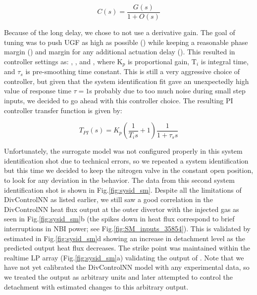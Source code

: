 \begin{equation}
 C(s) = \frac{G(s)}{1 + O(s)}
\label{eq:cltf}
\end{equation}



Because of the long delay, we chose to not use a derivative gain.
The goal of tuning was to push \ac{UGF} as high as possible (\AfracUGF) while keeping a reasonable phase margin (\AfracPhaseMargin) and margin for any additional actuation delay (\AfracDelayMargin).
This resulted in controller settings as: \AfracKp, \AfracTi, and \Afracstau, where K$_p$ is proportional gain, T$_i$ is integral time, and $\tau_s$ is pre-smoothing time constant.
This is still a very aggressive choice of controller, but given that the system identification fit gave an unexpectedly high value of response time $\tau=1$s probably due to too much noise during small step inputs, we decided to go ahead with this controller choice.
The resulting PI controller transfer function is given by:

\begin{equation}
 T_{PI}(s) = K_p \left( \frac{1}{T_i s} + 1\right) \frac{1}{1 + \tau_s s}
\label{eq:PI}
\end{equation}

Unfortunately, the surrogate model was not configured properly in this system identification shot due to technical errors, so we repeated a system identification but this time we decided to keep the nitrogen valve in the constant open position, to look for any deviation in the behavior.
The data from this second system identification shot is shown in Fig.\ref{fig:sysid_sm}.
Despite all the limitations of DivControlNN as listed earlier, we still saw a good correlation in the DivControlNN heat flux output at the outer divertor with the injected gas as seen in Fig.\ref{fig:sysid_sm}b (the spikes down in heat flux correspond to brief interruptions in NBI power; see Fig.\ref{fig:SM_inputs_35854}).
This is validated by estimated \Afrac in Fig.\ref{fig:sysid_sm}d showing an increase in detachment level as the predicted output heat flux decreases.
The strike point was maintained within the realtime \ac{LP}  array (Fig.\ref{fig:sysid_sm}a) validating the output of \Afrac{}.
Note that we have not yet calibrated the DivControlNN model with any experimental data, so we treated the output as arbitrary units and later attempted to control the detachment with estimated changes to this arbitrary output.

